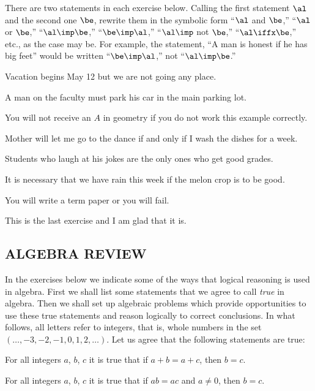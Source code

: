 \documentclass[11pt]{book}
\theoremstyle{bkplain}
\theoremstyle{XIplainnote}
\theoremstyle{bkplain}
\theoremstyle{bkplain}
\begin{document}
There are two statements in each exercise below. Calling the first statement $\al$
and the second one $\be$, rewrite them in the symbolic form ``$\al$ and $\be$,''
``$\al$ or $\be$,'' ``$\al \imp \be$,'' ``$\be \imp \al$,'' ``$\al \imp$ not
$\be$,'' ``$\al \iffx \be$,'' etc., as the case may be. For example, the statement,
``A man is honest if he has big feet'' would be written ``$\be \imp \al$,'' not
``$\al \imp \be$.''

\begin{exlist}\setcounter{exlisti}{13}
\item Vacation begins May 12 but we are not going any place.
\item A man on the faculty must park his car in the main parking lot.
\item You will not receive an $A$ in geometry if you do not work this example
      correctly.
\item Mother will let me go to the dance if and only if I wash the dishes for a
      week.
\item Students who laugh at his jokes are the only ones who get good grades.
\item It is necessary that we have rain this week if the melon crop is to be good.
\item You will write a term paper or you will fail.
\item This is the last exercise and I am glad that it is.
\end{exlist}

\subsection*{ALGEBRA REVIEW}

In the exercises below we indicate some of the ways that logical reasoning is used
in algebra. First we shall list some statements that we agree to call \emph{true}
in algebra. Then we shall set up algebraic problems which provide opportunities to
use these true statements and reason logically to correct conclusions. In what
follows, all letters refer to integers, that is, whole numbers in the set
$(\dots, -3, -2, -1, 0, 1, 2, \dots)$. Let us agree that the following statements
are true:

\begin{exlist}
\item For all integers $a$, $b$, $c$ it is true that if $a + b = a + c$, then
      $b = c$.
\item For all integers $a$, $b$, $c$ it is true that if $ab = ac$ and $a \neq 0$,
      then $b = c$.
\end{exlist}
\end{document}

